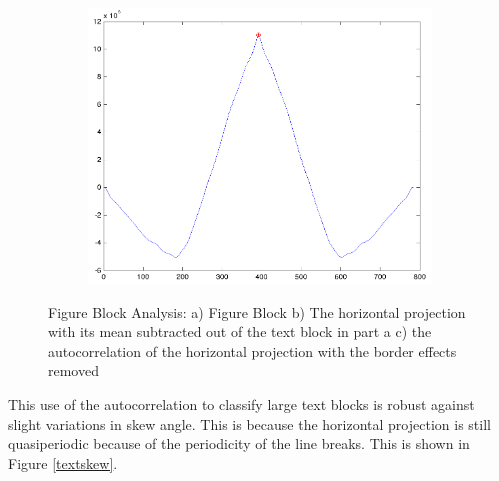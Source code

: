 \documentclass{report}
\begin{document}
\begin{figure}
\begin{subfigure}{.33\columnwidth}
\includegraphics[width=\columnwidth]{figauto.png}%
\label{figauto}
\end{subfigure}
\caption{Figure Block Analysis: a) Figure Block b) The horizontal projection with its mean subtracted out of the text block in part a c) the autocorrelation of the horizontal projection with the border effects removed}
\label{figfigure}
\end{figure}


This use of the autocorrelation to classify large text blocks is robust against slight variations in skew angle. This is because the horizontal projection is still quasiperiodic because of the periodicity of the line breaks. This is shown in Figure \ref{textskew}.
\end{document}
